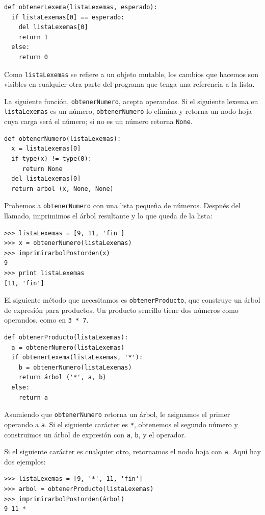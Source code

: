 \beforeverb
\begin{verbatim}
def obtenerLexema(listaLexemas, esperado):
  if listaLexemas[0] == esperado:
    del listaLexemas[0]
    return 1
  else:
    return 0
\end{verbatim}
\afterverb
%
Como \texttt{listaLexemas} se refiere a un objeto mutable, los 
cambios que hacemos son visibles en cualquier otra parte del programa
que tenga una referencia a la lista.

La siguiente función, \texttt{obtenerNumero}, acepta operandos.
Si el siguiente lexema en \texttt{listaLexemas} es un número,
\texttt{obtenerNumero} lo elimina y retorna un nodo hoja cuya
carga será el número; si no es un número retorna \texttt{None}.

\beforeverb
\begin{verbatim}
def obtenerNumero(listaLexemas):
  x = listaLexemas[0]
  if type(x) != type(0): 
     return None
  del listaLexemas[0]
  return arbol (x, None, None)
\end{verbatim}
\afterverb
%
Probemos a  \texttt{obtenerNumero} con una lista pequeña de números. 
Después del llamado, imprimimos el árbol resultante
y lo que queda de la lista:

\beforeverb
\begin{verbatim}
>>> listaLexemas = [9, 11, 'fin']
>>> x = obtenerNumero(listaLexemas)
>>> imprimirarbolPostorden(x)
9
>>> print listaLexemas
[11, 'fin']
\end{verbatim}
\afterverb
%
El siguiente método que necesitamos es \texttt{obtenerProducto}, que
construye un árbol de expresión para productos. Un producto sencillo
tiene dos números como operandos, como en \texttt{3 * 7}.


\beforeverb
\begin{verbatim}
def obtenerProducto(listaLexemas):
  a = obtenerNumero(listaLexemas)
  if obtenerLexema(listaLexemas, '*'):
    b = obtenerNumero(listaLexemas)
    return árbol ('*', a, b)
  else:
    return a
\end{verbatim}
\afterverb
%
Asumiendo que  \texttt{obtenerNumero} retorna un árbol,
le asignamos el primer operando a \texttt{a}.
Si el siguiente carácter es \texttt{*}, obtenemos el 
segundo número y construimos un árbol de expresión con
\texttt{a}, \texttt{b}, y el operador.

Si el siguiente carácter es cualquier otro, retornamos el 
nodo hoja con  \texttt{a}.  Aquí hay dos ejemplos:

\beforeverb
\begin{verbatim}
>>> listaLexemas = [9, '*', 11, 'fin']
>>> arbol = obtenerProducto(listaLexemas)
>>> imprimirarbolPostorden(árbol)
9 11 *
\end{verbatim}
\afterverb

